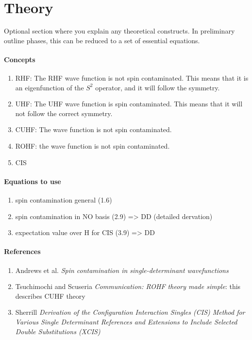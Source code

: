 \documentclass[twoside,twocolumn,9pt]{article}
\begin{document}
\section{Theory}

Optional section where you explain any theoretical constructs. In preliminary outline phases, this can be reduced to a set of essential equations.
\paragraph*{Concepts}
\begin{enumerate}
  \item RHF: The RHF wave function is not spin contaminated. This means that it is an eigenfunction of the $S^2$ operator, and it will follow the symmetry.
  \item UHF: The UHF wave function is spin contaminated. This means that it will not follow the correct symmetry.
  \item CUHF: The wave function is not spin contaminated.
  \item ROHF: the wave function is not spin contaminated.
  \item CIS
\end{enumerate}
\paragraph*{Equations to use}
\begin{enumerate}
  \item spin contamination general (1.6)
  \item spin contamination in NO basis (2.9) => DD (detailed dervation)
  \item expectation value over H for CIS (3.9) => DD
\end{enumerate}
\paragraph*{References}
\begin{enumerate}
  \item Andrews et al. \textit{Spin contamination in single-determinant wavefunctions}
  \item Tsuchimochi and Scuseria \textit{Communication: ROHF theory made simple}: this describes CUHF theory
  \item Sherrill \textit{Derivation of the Configuration Interaction Singles (CIS) Method for Various Single Determinant References and Extensions to Include Selected Double Substitutions (XCIS)}
\end{enumerate}
\end{document}
